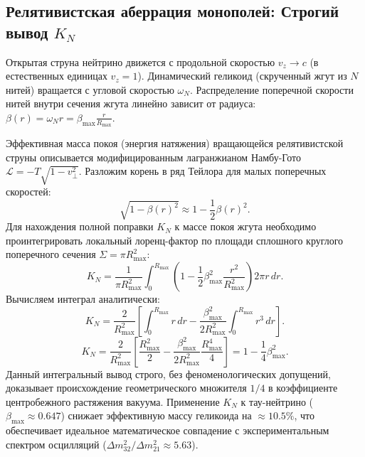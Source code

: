 \documentclass[12pt,a4paper]{article}
\begin{document}
\subsection{Релятивистская аберрация монополей: Строгий вывод $K_N$}
Открытая струна нейтрино движется с продольной скоростью $v_z \to c$ (в естественных единицах $v_z = 1$). Динамический геликоид (скрученный жгут из $N$ нитей) вращается с угловой скоростью $\omega_N$. Распределение поперечной скорости нитей внутри сечения жгута линейно зависит от радиуса: $\beta(r) = \omega_N r = \beta_{\text{max}} \frac{r}{R_{\text{max}}}$.

Эффективная масса покоя (энергия натяжения) вращающейся релятивистской струны описывается модифицированным лагранжианом Намбу-Гото $\mathcal{L} = -T \sqrt{1 - v_\perp^2}$. Разложим корень в ряд Тейлора для малых поперечных скоростей:
\begin{equation}
\sqrt{1 - \beta(r)^2} \approx 1 - \frac{1}{2} \beta(r)^2.
\end{equation}
Для нахождения полной поправки $K_N$ к массе покоя жгута необходимо проинтегрировать локальный лоренц-фактор по площади сплошного круглого поперечного сечения $\Sigma = \pi R_{\text{max}}^2$:
\begin{equation}
K_N = \frac{1}{\pi R_{\text{max}}^2} \int_0^{R_{\text{max}}} \left( 1 - \frac{1}{2} \beta_{\text{max}}^2 \frac{r^2}{R_{\text{max}}^2} \right) 2\pi r \, dr.
\end{equation}
Вычисляем интеграл аналитически:
\begin{equation}
K_N = \frac{2}{R_{\text{max}}^2} \left[ \int_0^{R_{\text{max}}} r \, dr - \frac{\beta_{\text{max}}^2}{2 R_{\text{max}}^2} \int_0^{R_{\text{max}}} r^3 \, dr \right].
\end{equation}
\begin{equation}
K_N = \frac{2}{R_{\text{max}}^2} \left[ \frac{R_{\text{max}}^2}{2} - \frac{\beta_{\text{max}}^2}{2 R_{\text{max}}^2} \frac{R_{\text{max}}^4}{4} \right] = 1 - \frac{1}{4} \beta_{\text{max}}^2.
\label{eq:k_factor}
\end{equation}
Данный интегральный вывод строго, без феноменологических допущений, доказывает происхождение геометрического множителя $1/4$ в коэффициенте центробежного растяжения вакуума. Применение $K_N$ к тау-нейтрино ($\beta_{\text{max}} \approx 0.647$) снижает эффективную массу геликоида на $\approx 10.5\%$, что обеспечивает идеальное математическое совпадение с экспериментальным спектром осцилляций ($\Delta m^2_{32} / \Delta m^2_{21} \approx 5.63$).
\end{document}
